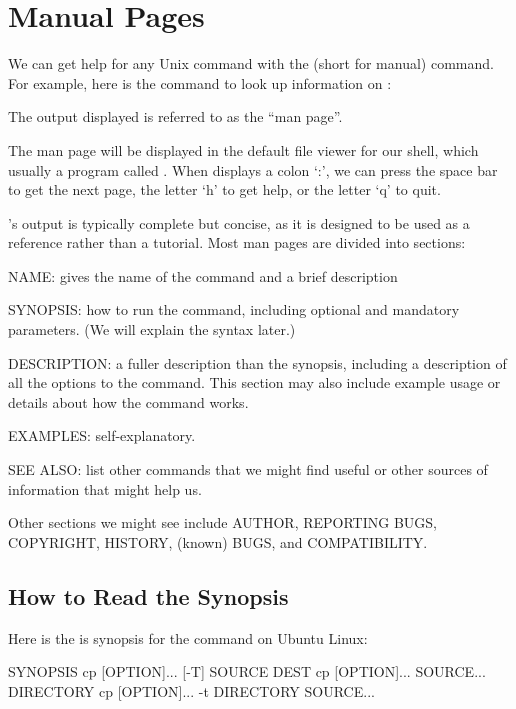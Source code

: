 \section{Manual Pages}

We can get help for any Unix command with the  (short for
manual) command. For example, here is the command to look up information
on :


The output displayed is referred to as the ``man page''.

The man page will be displayed in the default file viewer for our shell,
which usually a program called . When 
displays a colon `:', we can press the space bar to get the next page,
the letter `h' to get help, or the letter `q' to quit.

's output is typically complete but concise, as it is
designed to be used as a reference rather than a tutorial. Most man
pages are divided into sections:

\begin{swcitemize}
\item
  NAME: gives the name of the command and a brief description
\item
  SYNOPSIS: how to run the command, including optional and mandatory
  parameters. (We will explain the syntax later.)
\item
  DESCRIPTION: a fuller description than the synopsis, including a
  description of all the options to the command. This section may also
  include example usage or details about how the command works.
\item
  EXAMPLES: self-explanatory.
\item
  SEE ALSO: list other commands that we might find useful or other
  sources of information that might help us.
\end{swcitemize}

Other sections we might see include AUTHOR, REPORTING BUGS, COPYRIGHT,
HISTORY, (known) BUGS, and COMPATIBILITY.

\subsection*{How to Read the Synopsis}

Here is the is synopsis for the  command on Ubuntu Linux:

\begin{VerbOut}
SYNOPSIS
   cp [OPTION]... [-T] SOURCE DEST
   cp [OPTION]... SOURCE... DIRECTORY
   cp [OPTION]... -t DIRECTORY SOURCE...
\end{VerbOut}


